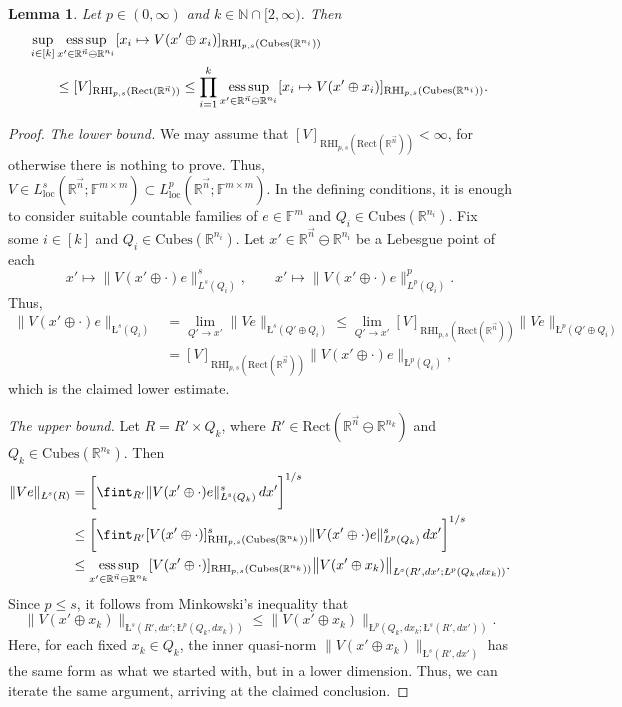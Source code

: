 \documentclass[11pt, reqno]{amsart}
\newtheorem{lemma}[theorem]{Lemma}
\theoremstyle{definition}
\theoremstyle{remark}
\numberwithin{equation}{section}
\newcommand{\F}{\mathbb F}
\newcommand{\R}{\mathbb R}
\newcommand{\vn}{\vec n}
\newcommand{\esssup}{\operatornamewithlimits{ess\,sup}}
\newcommand{\loc}{\mathrm{loc}}
\newcommand{\aveL}{\textit{\L}}
\newcommand{\Norm}[2]{\|#1\|_{#2}}
\newcommand{\bNorm}[2]{\big\|#1\big\|_{#2}}
\newcommand{\Cubes}{\mathrm{Cubes}}
\newcommand{\Rect}{\mathrm{Rect}}
\newcommand{\RHI}{\mathrm{RHI}}
\begin{document}
\begin{lemma}\label{RHI prod vs coord}
Let $p\in(0,\infty)$ and $k\in\mathbb N\cap[2,\infty)$. Then
\begin{equation*}
\begin{split}
\sup_{i\in[k]} &\esssup_{x'\in\R^{\vn}\ominus\R^{n_i}} [x_i\mapsto V(x'\oplus x_i)]_{\RHI_{p,s}(\Cubes(\R^{n_i}))} \\
&\leq[V]_{\RHI_{p,s}(\Rect(\R^{\vn}))}
\leq\prod_{i=1}^k \esssup_{x'\in\R^{\vn}\ominus\R^{n_i}} [x_i\mapsto V(x'\oplus x_i)]_{\RHI_{p,s}(\Cubes(\R^{n_i}))}.
\end{split}
\end{equation*}
\end{lemma}


\begin{proof}
\textit{The lower bound.} We may assume that $[V]_{\RHI_{p,s}(\Rect(\R^{\vn}))}<\infty$, for otherwise there is nothing to prove. Thus, $V\in L_{\loc}^s(\R^{\vn};\F^{m\times m})\subset L_{\loc}^p(\R^{\vn};\F^{m\times m})$. In the defining conditions, it is enough to consider suitable countable families of $e\in\F^m$ and $Q_i\in\Cubes(\R^{n_i})$. Fix some $i\in[k]$ and $Q_i\in\Cubes(\R^{n_i})$.
Let $x'\in \R^{\vn}\ominus\R^{n_i}$ be a Lebesgue point of each
\begin{equation*}
x'\mapsto\Norm{V(x'\oplus\cdot)e}{L^s(Q_i)}^s,\qquad x'\mapsto \Norm{V(x'\oplus\cdot)e}{L^p(Q_i)}^p.
\end{equation*}
Thus,
\begin{align*}
\Norm{V(x'\oplus\cdot)e}{\aveL^s(Q_i)}
&=\lim_{Q'\to x'}\Norm{Ve}{\aveL^s(Q'\oplus Q_i)}
\leq \lim_{Q'\to x'}[V]_{\RHI_{p,s}(\Rect(\R^{\vn}))}\Norm{Ve}{\aveL^p(Q'\oplus Q_i)} \\
&=[V]_{\RHI_{p,s}(\Rect(\R^{\vn}))}\Norm{V(x'\oplus\cdot)e}{\aveL^p(Q_i)},
\end{align*}
which is the claimed lower estimate.

\textit{The upper bound.} Let $R=R'\times Q_k$, where $R'\in\Rect(\R^{\vn}\ominus\R^{n_k})$ and $Q_k\in\Cubes(\R^{n_k})$. Then
\begin{align*}
\Norm{Ve}{\aveL^s(R)}
&=\bigg[\fint_{R'}\Norm{V(x'\oplus \cdot)e}{\aveL^s(Q_k)}^s\, dx'\bigg]^{1/s} \\
&\leq\bigg[\fint_{R'}[V(x'\oplus\cdot)]_{\RHI_{p,s}(\Cubes(\R^{n_k}))}^s\Norm{V(x'\oplus \cdot)e}{\aveL^p(Q_k)}^s \, dx'\bigg]^{1/s} \\
&\leq\esssup_{x'\in\R^{\vn}\ominus\R^{n_k}}[V(x'\oplus\cdot)]_{\RHI_{p,s}(\Cubes(\R^{n_k}))}
\bNorm{V(x'\oplus x_k)}{\aveL^s(R',dx';\aveL^p(Q_k,dx_k))}.
\end{align*}
Since $p\leq s$, it follows from Minkowski's inequality that
\begin{equation*}
\bNorm{V(x'\oplus x_k)}{\aveL^s(R',dx';\aveL^p(Q_k,dx_k))}
\leq\bNorm{V(x'\oplus x_k)}{\aveL^p(Q_k,dx_k;\aveL^s(R',dx'))}.
\end{equation*}
Here, for each fixed $x_k\in Q_k$, the inner quasi-norm $\Norm{V(x'\oplus x_k)}{\aveL^s(R',dx')}$ has the same form as what we started with, but in a lower dimension. Thus, we can iterate the same argument, arriving at the claimed conclusion.
\end{proof}
\end{document}
